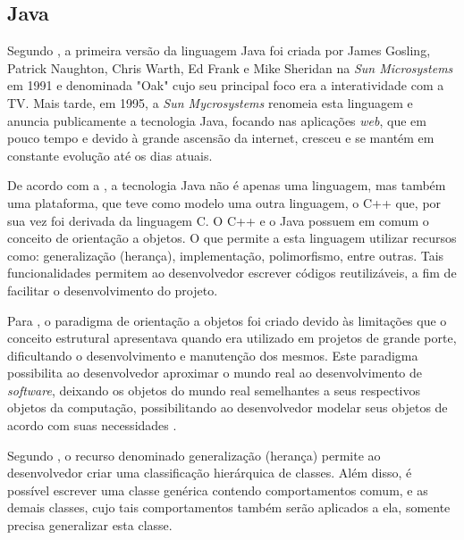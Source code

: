 \subsection{Java}

\par Segundo , a primeira versão da linguagem Java foi criada por James Gosling, Patrick Naughton, Chris Warth, Ed Frank e Mike Sheridan na \textit{Sun Microsystems} em 1991 e denominada "Oak" cujo seu principal foco era a interatividade com a TV. Mais tarde, em 1995, a \textit{Sun Mycrosystems} renomeia esta linguagem e anuncia publicamente a tecnologia Java, focando nas aplicações \textit{web}, que em pouco tempo e devido à grande ascensão da internet, cresceu e se mantém em constante evolução até os dias atuais.

\par De acordo com a , a tecnologia Java não é apenas uma linguagem, mas também uma plataforma, que teve como modelo uma outra linguagem, o C++ que, por sua vez foi derivada da linguagem C. O C++ e o Java possuem em comum o conceito de orientação a objetos. O que permite a esta linguagem utilizar recursos como: generalização (herança), implementação, polimorfismo, entre outras. Tais funcionalidades permitem ao desenvolvedor escrever códigos reutilizáveis, a fim de facilitar o desenvolvimento do projeto.

\par Para , o paradigma de orientação a objetos foi criado devido às limitações que o conceito estrutural apresentava quando era utilizado em projetos de grande porte, dificultando o desenvolvimento e manutenção dos mesmos. Este paradigma possibilita ao desenvolvedor aproximar o mundo real ao desenvolvimento de \textit{software}, deixando os objetos do mundo real semelhantes a seus respectivos objetos da computação, possibilitando ao desenvolvedor modelar seus objetos de acordo com suas necessidades \cite{tcc_univas_faria_aspectj_programacao_orientada_aspecto_java}.

Segundo , o recurso denominado generalização (herança) permite ao desenvolvedor criar uma classificação hierárquica de classes. Além disso, é possível escrever uma classe genérica contendo comportamentos comum, e as demais classes, cujo tais comportamentos também serão aplicados a ela, somente precisa generalizar esta classe.

